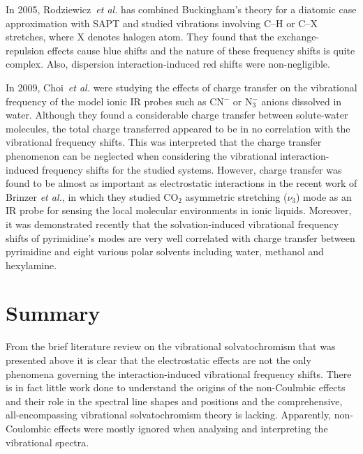 \documentclass[b5paper,oneside,fleqn,11pt]{book}
\begin{document}
\begin{refsection}
In 2005, Rodziewicz~\emph{et al.} has combined Buckingham's theory for a diatomic case approximation with SAPT 
and studied vibrations involving C--H or C--X
stretches, where X denotes halogen atom. \citep{Rodziewicz.Rutkowski.Melikova.Koll.ChemPhysChem.2005} 
They found that the exchange\hyp{}repulsion effects
cause blue shifts and the nature of these frequency shifts is quite complex. Also, dispersion
interaction\hyp{}induced red shifts were non\hyp{}negligible. 

In 2009, Choi~\emph{et al.} were studying the effects of charge transfer on the vibrational
frequency of the model ionic IR probes such as CN$^-$ or N$_3^-$ anions dissolved in water. \citep{Lee.Choi.Cho.PCCP.2010}
Although they found a considerable charge
transfer between solute\hyp{}water molecules, the total charge transferred appeared to be in no
correlation with the vibrational frequency shifts. This was interpreted that the charge transfer 
phenomenon can be neglected when considering the vibrational interaction\hyp{}induced frequency shifts
for the studied systems. However, charge transfer was found to be almost as important as electrostatic
interactions in the 
recent work of Brinzer \emph{et al.}, \citep{Brinzer.Berquist.Zhe.Dutta.Johnson.Krisher.Lambrecht.Garrett-Roe.JCP.2015} 
in which they studied CO$_2$ asymmetric
stretching ($\nu_3$) mode as an IR probe for sensing the local molecular environments in ionic
liquids. Moreover, it was demonstrated recently that the solvation\hyp{}induced vibrational
frequency shifts of pyrimidine's modes are very well correlated with charge transfer between
pyrimidine and eight various polar solvents including water, methanol
and hexylamine. \citep{Wright.Howard.Howard.Tschumper.Hammer.JPCA.2013}

\section{Summary}

From the brief literature review on the vibrational solvatochromism
that was presented above it is clear that the electrostatic effects
are not the only phenomena governing the interaction\hyp{}induced 
vibrational frequency shifts. There is in fact little work done
to understand the origins of the non\hyp{}Coulmbic effects and their
role in the spectral line shapes and positions and the comprehensive,
all\hyp{}encompassing vibrational solvatochromism theory is lacking. Apparently,
non\hyp{}Coulombic effects were mostly ignored when analysing and interpreting
the vibrational spectra.


\end{refsection}
\end{document}

